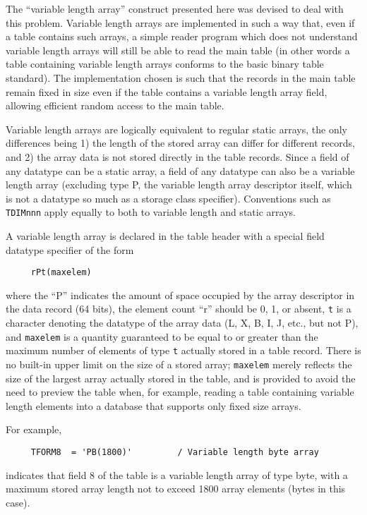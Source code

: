 The ``variable length array'' construct presented
here was devised to deal
with this problem.  Variable length arrays are implemented in such a way
that, even if a table contains such arrays, a simple reader program which
does not understand variable length arrays will still be able to read the
main table (in other words a table containing variable length arrays
conforms to the basic binary table standard).  The implementation chosen
is
such that the records in the main table remain fixed in size even if the
table contains a variable length array field, allowing efficient random
access to the main table.

Variable length arrays are logically equivalent to regular static arrays, 
the only differences being 1) the length of the stored array can differ for
different records, and 2) the array data is not stored directly in the table
records.  Since a field of any datatype can be a static array, a field of
any datatype can also be a variable length array (excluding type P, the
variable length array descriptor itself, which is not a datatype so much
as a storage class specifier).  Conventions such
 as {\tt TDIMnnn} apply equally
to both to variable length and static arrays.

A variable length array is declared in the table header with a special
field datatype specifier of the form

\begin{verbatim}
     rPt(maxelem)
\end{verbatim}
where the ``P'' indicates the amount of space occupied by the array
descriptor in the data record (64 bits), the element count ``r'' should be
0, 1, or absent, {\tt t} is a character denoting the datatype of the array
data (L, X, B, I, J, etc., but not P), and {\tt maxelem} is a quantity
guaranteed to be equal to or greater than the maximum number of elements
of
type {\tt t} actually stored in a table record.  There is no built-in upper
limit on the size of a stored array; {\tt maxelem} merely reflects the size
of the largest array actually stored in the table, and is provided to avoid
the need to preview the table when, for example, reading a table containing
variable length elements into a database that supports only fixed size
arrays.

For example, 
\begin{verbatim}
     TFORM8  = 'PB(1800)'         / Variable length byte array
\end{verbatim}
indicates that field 8 of the table is a variable length array of type byte, 
with a maximum stored array length not to exceed 1800 array elements
(bytes
in this case).

